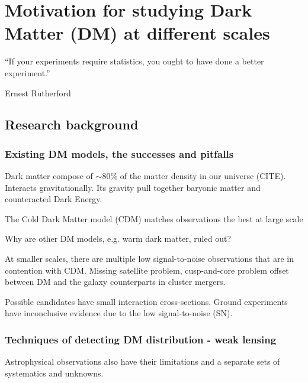 \documentclass[ucdthesis.tex]{subfiles}
\begin{document}
    \doublespacing

		\chapter{Motivation for studying Dark Matter (DM) at different 
			scales}		
		\label{chapter:1}
    \epigraph{``If your experiments require statistics, you ought to have done a
		better experiment.''}{Ernest Rutherford} 

		\section{Research background}
		\subsection{Existing DM models, the successes and pitfalls}
		Dark matter compose of $\sim$80\% of the matter density in our universe
		(CITE). 
		Interacts gravitationally.	
		Its gravity pull together baryonic matter and counteracted 
		Dark Energy.  

		The Cold Dark Matter model (CDM) matches observations the best at large scale

		Why are other DM models, e.g. warm dark matter, ruled out?

		At smaller scales, there are multiple low signal-to-noise observations that 
		are in contention with CDM. Missing satellite problem, cusp-and-core problem 
		offset between DM and the galaxy counterparts in cluster mergers.

		Possible candidates have small interaction cross-sections. 
		Ground  experiments have inconclusive evidence due to the low
		signal-to-noise (SN).

		\subsection{Techniques of detecting DM distribution - weak lensing}
		Astrophysical observations also have their limitations and a separate sets
		of systematics and unknowns.
\end{document}

